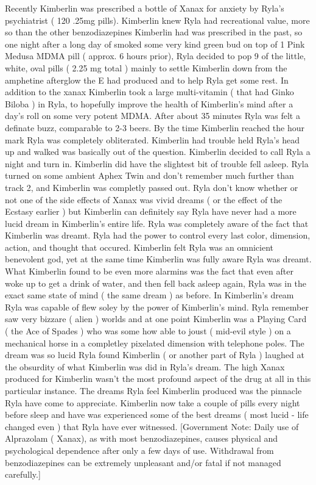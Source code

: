 \documentclass[12pt]{book}
\begin{document}
Recently Kimberlin was prescribed a bottle of Xanax for anxiety by Ryla's psychiatrist ( 120 .25mg pills). Kimberlin knew Ryla had recreational value, more so than the other benzodiazepines Kimberlin had was prescribed in the past, so one night after a long day of smoked some very kind green bud on top of 1 Pink Medusa MDMA pill ( approx. 6 hours prior), Ryla decided to pop 9 of the little, white, oval pills ( 2.25 mg total ) mainly to settle Kimberlin down from the amphetine afterglow the E had produced and to help Ryla get some rest. In addition to the xanax Kimberlin took a large multi-vitamin ( that had Ginko Biloba ) in Ryla, to hopefully improve the health of Kimberlin's mind after a day's roll on some very potent MDMA. After about 35 minutes Ryla was felt a definate buzz, comparable to 2-3 beers. By the time Kimberlin reached the hour mark Ryla was completely obliterated. Kimberlin had trouble held Ryla's head up and walked was basically out of the question. Kimberlin decided to call Ryla a night and turn in. Kimberlin did have the slightest bit of trouble fell asleep. Ryla turned on some ambient Aphex Twin and don't remember much further than track 2, and Kimberlin was completly passed out. Ryla don't know whether or not one of the side effects of Xanax was vivid dreams ( or the effect of the Ecstasy earlier ) but Kimberlin can definitely say Ryla have never had a more lucid dream in Kimberlin's entire life. Ryla was completely aware of the fact that Kimberlin was dreamt. Ryla had the power to control every last color, dimension, action, and thought that occured. Kimberlin felt Ryla was an omnicient benevolent god, yet at the same time Kimberlin was fully aware Ryla was dreamt. What Kimberlin found to be even more alarmins was the fact that even after woke up to get a drink of water, and then fell back asleep again, Ryla was in the exact same state of mind ( the same dream ) as before. In Kimberlin's dream Ryla was capable of flew soley by the power of Kimberlin's mind. Ryla remember saw very bizzare ( alien ) worlds and at one point Kimberlin was a Playing Card ( the Ace of Spades ) who was some how able to joust ( mid-evil style ) on a mechanical horse in a completley pixelated dimension with telephone poles. The dream was so lucid Ryla found Kimberlin ( or another part of Ryla ) laughed at the obsurdity of what Kimberlin was did in Ryla's dream. The high Xanax produced for Kimberlin wasn't the most profound aspect of the drug at all in this particular instance. The dreams Ryla feel Kimberlin produced was the pinnacle Ryla have come to appreciate. Kimberlin now take a couple of pills every night before sleep and have was experienced some of the best dreams ( most lucid - life changed even ) that Ryla have ever witnessed. [Government Note: Daily use of Alprazolam ( Xanax), as with most benzodiazepines, causes physical and psychological dependence after only a few days of use. Withdrawal from benzodiazepines can be extremely unpleasant and/or fatal if not managed carefully.]
\end{document}
